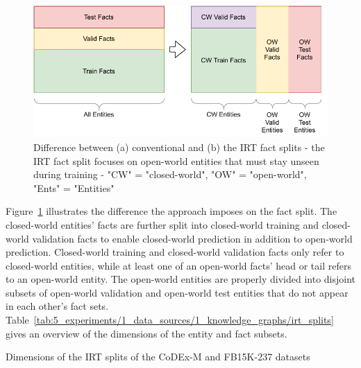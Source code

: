 \begin{figure}
    \centering
    \includegraphics[width=\textwidth]{5_experiments/1_data_sources/1_knowledge_graphs/irt_split}
    \caption{Difference between (a) conventional and (b) the IRT fact splits - the IRT fact split focuses on open-world entities that must stay unseen during training - "CW" = "closed-world", "OW" = "open-world", "Ents" = "Entities"}
    \label{fig:5_experiments/1_data_sources/1_knowledge_graphs/irt_split}
\end{figure}

Figure~\ref{fig:5_experiments/1_data_sources/1_knowledge_graphs/irt_split} illustrates the difference the approach imposes on the fact split. The closed-world entities' facts are further split into closed-world training and closed-world validation facts to enable closed-world prediction in addition to open-world prediction. Closed-world training and closed-world validation facts only refer to closed-world entities, while at least one of an open-world facts' head or tail refers to an open-world entity. The open-world entities are properly divided into disjoint subsets of open-world validation and open-world test entities that do not appear in each other's fact sets. Table~\ref{tab:5_experiments/1_data_sources/1_knowledge_graphs/irt_splits} gives an overview of the dimensions of the entity and fact subsets.

\begin{table}[h]
    \centering
    
    \caption{Dimensions of the IRT splits of the CoDEx-M and FB15K-237 datasets}
    \label{tab:5_experiments/1_data_sources/1_knowledge_graphs/irt_splits}
\end{table}
